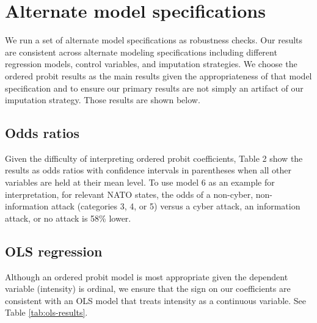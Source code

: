 \documentclass[
]{article}
\begin{document}
\hypertarget{alternate-model-specifications}{%
\section{Alternate model specifications}\label{alternate-model-specifications}}

We run a set of alternate model specifications as robustness checks. Our results are consistent across alternate modeling specifications including different regression models, control variables, and imputation strategies. We choose the ordered probit results as the main results given the appropriateness of that model specification and to ensure our primary results are not simply an artifact of our imputation strategy. Those results are shown below.

\hypertarget{odds-ratios}{%
\subsection{Odds ratios}\label{odds-ratios}}

Given the difficulty of interpreting ordered probit coefficients, Table 2 show the results as odds ratios with confidence intervals in parentheses when all other variables are held at their mean level. To use model 6 as an example for interpretation, for relevant NATO states, the odds of a non-cyber, non-information attack (categories 3, 4, or 5) versus a cyber attack, an information attack, or no attack is 58\% lower.



\hypertarget{ols-regression}{%
\subsection{OLS regression}\label{ols-regression}}

Although an ordered probit model is most appropriate given the dependent variable (intensity) is ordinal, we ensure that the sign on our coefficients are consistent with an OLS model that treats intensity as a continuous variable. See Table \ref{tab:ols-results}.
\end{document}
